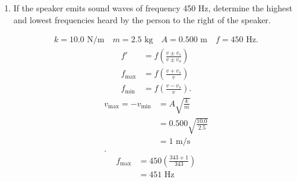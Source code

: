 \documentclass{zc-ust-hw}
\begin{document}
\begin{enumerate}[label=(\alph*)]
  \item If the speaker emits sound waves of frequency 450 Hz, determine the
    highest and lowest frequencies heard by the person to the right of the
    speaker.

    \begin{align}
      k = 10.0 \text{ N/m}
      \quad
      m = 2.5 \text{ kg}
      \quad
      A = 0.500 \text{ m}
      \quad
      f = 450 \text{ Hz}
    .\end{align}
    \begin{align}
      f' &= f \left( \frac{v \pm v_s}{v \pm v_o} \right) \\
      f_{\text{max}} &= f \left( \frac{v + v_s}{v} \right) \\
      f_{\text{min}} &= f \left( \frac{v - v_s}{v} \right)
    .\end{align}
    \begin{align}
      v_{\text{max}} = -v_{\text{min}} &= A \sqrt{\frac{k}{m}}  \\
              &= 0.500 \sqrt{\frac{10.0}{2.5}} \\
              &= 1 \text{ m/s} \\
    .\end{align}
    \begin{align}
      f_{\text{max}} &= 450 \left( \frac{343 + 1}{343} \right) \\
                     &= 451 \text{ Hz} \\

\end{align}
\end{enumerate}
\end{document}
